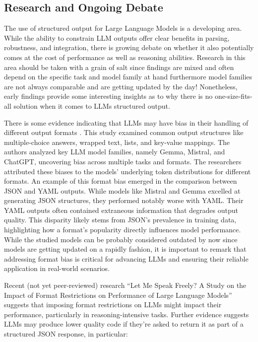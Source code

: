 \subsection{Research and Ongoing Debate}

The use of structured output for Large Language Models is a developing area. While the ability to constrain LLM outputs offer clear benefits in parsing, robustness, and integration, there is growing debate on whether it also potentially comes at the cost of performance as well as reasoning abilities. Research in this area should be taken with a grain of salt since findings are mixed and often depend on the specific task and model family at hand furthermore model families are not always comparable and are getting updated by the day! Nonetheless, early findings provide some interesting insights as to why there is no one-size-fits-all solution when it comes to LLMs structured output.

There is some evidence indicating that LLMs may have bias in their handling of different output formats \cite{long2024llms}. This study examined common output structures like multiple-choice answers, wrapped text, lists, and key-value mappings. The authors analyzed key LLM model families, namely Gemma, Mistral, and ChatGPT, uncovering bias across multiple tasks and formats. The researchers attributed these biases to the models' underlying token distributions for different formats. An example of this format bias emerged in the comparison between JSON and YAML outputs. While models like Mistral and Gemma excelled at generating JSON structures, they performed notably worse with YAML. Their YAML outputs often contained extraneous information that degrades output quality. This disparity likely stems from JSON's prevalence in training data, highlighting how a format's popularity directly influences model performance. While the studied models can be probably considered outdated by now since models are getting updated on a rapidly fashion, it is important to remark that addressing format bias is critical for advancing LLMs and ensuring their reliable application in real-world scenarios.

Recent (not yet peer-reviewed) research ``Let Me Speak Freely? A Study on the Impact of Format Restrictions on Performance of Large Language Models'' \cite{tam2024letspeakfreelystudy} suggests that imposing format restrictions on LLMs might impact their performance, particularly in reasoning-intensive tasks. Further evidence \cite{aider2024codejson} suggests LLMs may produce lower quality code if they're asked to return it as part of a structured JSON response, in particular:

